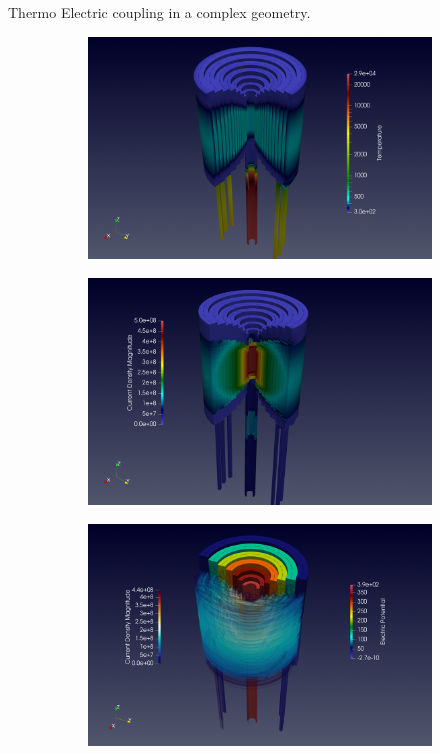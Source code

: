 Thermo Electric coupling in a complex geometry.

\begin{figure}[h]
  \centering
  \begin{subfigure}[c]{0.49\textwidth}
    \centering
    \includegraphics[width=\textwidth]{graphics/feelpp/feelpp-benchmark-HL-31-temperature.png}
  \end{subfigure}
  \hfill
  \begin{subfigure}[c]{0.49\textwidth}
    \centering
    \includegraphics[width=\textwidth]{graphics/feelpp/feelpp-benchmark-HL-31-current_density.png}
  \end{subfigure}
  \begin{subfigure}[c]{0.49\textwidth}
    \centering
    \includegraphics[width=\textwidth]{graphics/feelpp/feelpp-benchmark-HL-31-potential_density_streamines.png}

\end{subfigure}
\end{figure}
